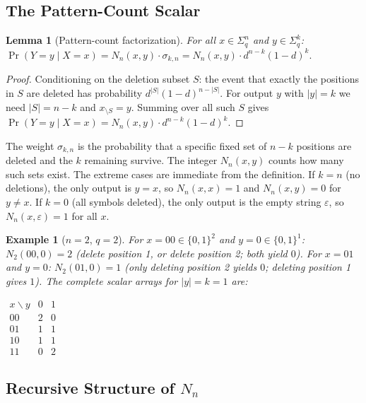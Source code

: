 \documentclass[conference]{IEEEtran}
\newtheorem{lemma}{Lemma}
\newtheorem{example}{Example}
\begin{document}
\subsection{The Pattern-Count Scalar}

\begin{lemma}[Pattern-count factorization]
\label{lem:factorization}
For all $x\in\Sigma_q^n$ and $y\in\Sigma_q^k$:
\(
  \Pr(Y=y\mid X=x)=N_n(x,y)\cdot\sigma_{k,n}
  =N_n(x,y)\cdot d^{n-k}(1-d)^k.
\)
\end{lemma}

\begin{proof}
Conditioning on the deletion subset $S$: the event that exactly the
positions in $S$ are deleted has probability $d^{|S|}(1-d)^{n-|S|}$.
For output $y$ with $|y|=k$ we need $|S|=n-k$ and $x_{\setminus S}=y$.
Summing over all such $S$ gives
$\Pr(Y=y\mid X=x)=N_n(x,y)\cdot d^{n-k}(1-d)^k$.
\end{proof}

The weight $\sigma_{k,n}$ is the probability that a specific fixed
set of $n-k$ positions are deleted and the $k$ remaining survive.
The integer $N_n(x,y)$ counts how many such sets exist.
The extreme cases are immediate from the definition.  If $k=n$ (no
deletions), the only output is $y=x$, so $N_n(x,x)=1$ and
$N_n(x,y)=0$ for $y\ne x$.  If $k=0$ (all symbols deleted), the
only output is the empty string $\varepsilon$, so $N_n(x,\varepsilon)=1$
for all $x$.


\begin{example}[$n=2$, $q=2$]
\label{ex:n2q2}
For $x=00\in\{0,1\}^2$ and $y=0\in\{0,1\}^1$:
$N_2(00,0)=2$ (delete position 1, or delete position 2; both yield $0$).
For $x=01$ and $y=0$: $N_2(01,0)=1$ (only deleting position 2 yields
$0$; deleting position 1 gives $1$).
The complete scalar arrays for $|y|=k=1$ are:
\begin{table}[h]
\centering
{\arraycolsep=3pt\small$\begin{array}{c|cc} x\backslash y & 0 & 1 \\\hline 00 & 2 & 0 \\ 01 & 1 & 1 \\ 10 & 1 & 1 \\ 11 & 0 & 2 \end{array}$}
\end{table}
\end{example}

\subsection{Recursive Structure of $N_n$}
\label{sec:recursion}
\end{document}
